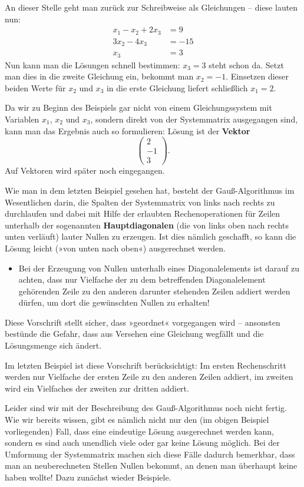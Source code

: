An dieser Stelle geht man zurück zur Schreibweise als Gleichungen -- diese lauten nun:
\begin{align*}
  x_1 - x_2 + 2x_3 &= 9\\
  3x_2 - 4x_3 &= -15\\
  x_3 &= 3
\end{align*}
Nun kann man die Lösungen schnell bestimmen: $x_3 = 3$ steht schon da. Setzt man dies in die zweite Gleichung ein, bekommt man $x_2 = -1$. Einsetzen dieser beiden Werte für $x_2$ und $x_3$ in die erste Gleichung liefert schließlich $x_1 = 2$.

Da wir zu Beginn des Beispiels gar nicht von einem Gleichungssystem mit Variablen $x_1$, $x_2$ und $x_3$, sondern direkt von der Systemmatrix ausgegangen sind, kann man das Ergebnis auch so formulieren: Lösung ist der \textbf{Vektor}
\[ \begin{pmatrix} 2 \\ -1 \\ 3 \end{pmatrix} . \]
Auf Vektoren wird später noch eingegangen.\beispielende

Wie man in dem letzten Beispiel gesehen hat, besteht der Gauß-Algorithmus im Wesentlichen darin, die Spalten der Systemmatrix von links nach rechts zu durchlaufen und dabei mit Hilfe der erlaubten Rechenoperationen für Zeilen unterhalb der sogenannten \textbf{Hauptdiagonalen} (die von links oben nach rechts unten verläuft) lauter Nullen zu erzeugen. Ist dies nämlich geschafft, so kann die Lösung leicht (»von unten nach oben«) ausgerechnet werden.
\begin{itemize}
  \item Bei der Erzeugung von Nullen unterhalb eines Diagonalelements ist darauf zu achten, dass nur Vielfache der zu dem betreffenden Diagonalelement gehörenden Zeile zu den anderen darunter stehenden Zeilen addiert werden dürfen, um dort die gewünschten Nullen zu erhalten!
\end{itemize}
Diese Vorschrift stellt sicher, dass »geordnet« vorgegangen wird -- ansonsten bestünde die Gefahr, dass aus Versehen eine Gleichung wegfällt und die Lösungsmenge sich ändert.

Im letzten Beispiel ist diese Vorschrift berücksichtigt: Im ersten Rechenschritt werden nur Vielfache der ersten Zeile zu den anderen Zeilen addiert, im zweiten wird ein Vielfaches der zweiten zur dritten addiert.

Leider sind wir mit der Beschreibung des Gauß-Algorithmus noch nicht fertig. Wie wir bereits wissen, gibt es nämlich nicht nur den (im obigen Beispiel vorliegenden) Fall, dass eine eindeutige Lösung ausgerechnet werden kann, sondern es sind auch unendlich viele oder gar keine Lösung möglich. Bei der Umformung der Systemmatrix machen sich diese Fälle dadurch bemerkbar, dass man an neuberechneten Stellen Nullen bekommt, an denen man überhaupt keine haben wollte! Dazu zunächst wieder Beispiele.

